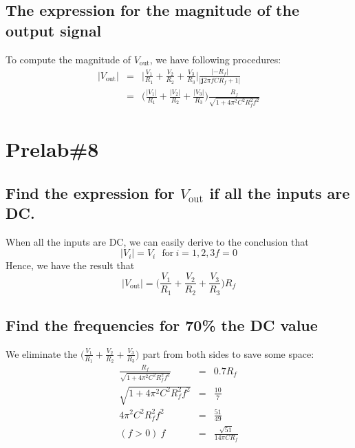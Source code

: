\documentclass{IEEEtran}
\begin{document}
	\subsection{The expression for the magnitude of the output signal}
	To compute the magnitude of $V_{\mathrm{out}}$, we have following procedures:\\
	\begin{eqnarray*}
		|V_{\mathrm{out}}| & = & \bigg|\frac{V_1} {R_1}+\frac {V_2}{R_2}+\frac{V_3}{R_3}\bigg|
		\frac{|-R_f|}{|\mathbf{j}2\pi fCR_f+1|}\\
		& = & \bigg(\frac{|V_1|}{R_1} + \frac{|V_2|}{R_2} + \frac{|V_3|}{R_3}\bigg) \frac{R_f}{\sqrt{1+
		4\pi^2C^2R_f^2f^2}}
	\end{eqnarray*}
	\section{\textbf{Prelab\#8}}
	\subsection{Find the expression for $V_{\mathrm{out}}$ if all the inputs are DC.}
	When all the inputs are DC, we can easily derive to the conclusion that\\
	\begin{equation*}
		|V_i| = V_i \mathrm{\ \ \ for\ } i = 1,2,3
		f = 0
	\end{equation*}
	Hence, we have the result that\\
	\begin{equation*}
		|V_{\mathrm{out}}| = \bigg(\frac{V_1}{R_1} + \frac{V_2}{R_2} + \frac{V_3}{R_3}\bigg)R_f
	\end{equation*}
	\subsection{Find the frequencies for 70\% the DC value}
	We eliminate the $\bigg(\frac{V_1}{R_1} + \frac{V_2}{R_2} + \frac{V_3}{R_3}\bigg)$ part from both sides to save some space:\\
	\begin{eqnarray*}
		 \frac{R_f}{\sqrt{1 + 4\pi^2C^2R_f^2f^2}}& = & 0.7 R_f\\
		\sqrt{1 + 4\pi^2C^2R_f^2f^2} & = & \frac{10}{7}\\
		4\pi^2C^2R_f^2f^2 & = & \frac{51}{49}\\
		(f>0)\ f & = & \frac{\sqrt{51}}{14\pi CR_f}
	\end{eqnarray*}
\end{document}
